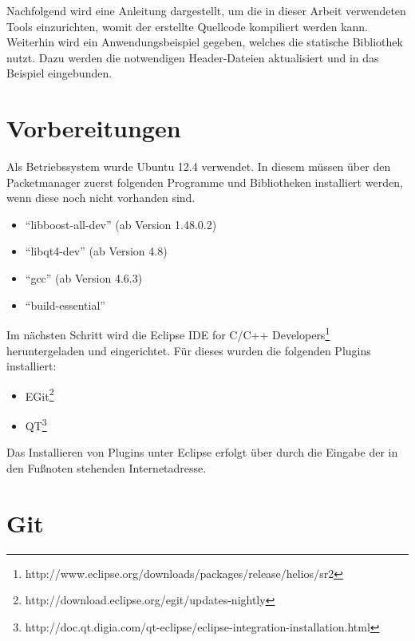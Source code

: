 Nachfolgend wird eine Anleitung dargestellt, um die in
dieser Arbeit verwendeten Tools einzurichten, womit der erstellte
Quellcode kompiliert werden kann. Weiterhin wird ein Anwendungsbeispiel
gegeben, welches die statische Bibliothek nutzt. Dazu werden die notwendigen
Header-Dateien aktualisiert und in das Beispiel eingebunden.

\section{Vorbereitungen}

Als Betriebssystem wurde Ubuntu 12.4 verwendet. In diesem m{\"u}ssen
{\"u}ber den Packetmanager zuerst folgenden Programme und Bibliotheken installiert
werden, wenn diese noch nicht vorhanden sind.

\begin{itemize}
\item "`libboost-all-dev"' (ab Version 1.48.0.2) 
\item "`libqt4-dev"' (ab Version 4.8)
\item "`gcc"' (ab Version 4.6.3)
\item "`build-essential"'
\end{itemize}

Im n{\"a}chsten Schritt wird die Eclipse IDE for C/C++
Developers\footnote{http://www.eclipse.org/downloads/packages/release/helios/sr2}
heruntergeladen und eingerichtet. F{\"u}r dieses wurden die folgenden Plugins installiert:

\begin{itemize}
\item EGit\footnote{http://download.eclipse.org/egit/updates-nightly}
\item QT\footnote{http://doc.qt.digia.com/qt-eclipse/eclipse-integration-installation.html}
\end{itemize}

Das Installieren von Plugins unter Eclipse erfolgt {\"u}ber  durch die Eingabe der in den Fu{\ss}noten stehenden
Internetadresse.

\section{Git}

